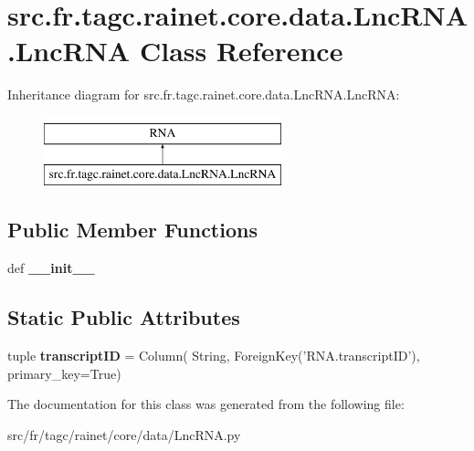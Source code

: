 \hypertarget{classsrc_1_1fr_1_1tagc_1_1rainet_1_1core_1_1data_1_1LncRNA_1_1LncRNA}{\section{src.\-fr.\-tagc.\-rainet.\-core.\-data.\-Lnc\-R\-N\-A.\-Lnc\-R\-N\-A Class Reference}
\label{classsrc_1_1fr_1_1tagc_1_1rainet_1_1core_1_1data_1_1LncRNA_1_1LncRNA}
}
Inheritance diagram for src.\-fr.\-tagc.\-rainet.\-core.\-data.\-Lnc\-R\-N\-A.\-Lnc\-R\-N\-A\-:\begin{figure}[H]
\begin{center}
\leavevmode
\includegraphics[height=2.000000cm]{classsrc_1_1fr_1_1tagc_1_1rainet_1_1core_1_1data_1_1LncRNA_1_1LncRNA}
\end{center}
\end{figure}
\subsection*{Public Member Functions}
\begin{DoxyCompactItemize}
\item 
\hypertarget{classsrc_1_1fr_1_1tagc_1_1rainet_1_1core_1_1data_1_1LncRNA_1_1LncRNA_a762274c557cd1facea9a63effe300ff1}{def {\bfseries \-\_\-\-\_\-init\-\_\-\-\_\-}}\label{classsrc_1_1fr_1_1tagc_1_1rainet_1_1core_1_1data_1_1LncRNA_1_1LncRNA_a762274c557cd1facea9a63effe300ff1}

\end{DoxyCompactItemize}
\subsection*{Static Public Attributes}
\begin{DoxyCompactItemize}
\item 
\hypertarget{classsrc_1_1fr_1_1tagc_1_1rainet_1_1core_1_1data_1_1LncRNA_1_1LncRNA_a2d3142d3b113878939c9edaf4cc92f94}{tuple {\bfseries transcript\-I\-D} = Column( String, Foreign\-Key('R\-N\-A.\-transcript\-I\-D'), primary\-\_\-key=True)}\label{classsrc_1_1fr_1_1tagc_1_1rainet_1_1core_1_1data_1_1LncRNA_1_1LncRNA_a2d3142d3b113878939c9edaf4cc92f94}

\end{DoxyCompactItemize}


The documentation for this class was generated from the following file\-:\begin{DoxyCompactItemize}
\item 
src/fr/tagc/rainet/core/data/Lnc\-R\-N\-A.\-py\end{DoxyCompactItemize}

